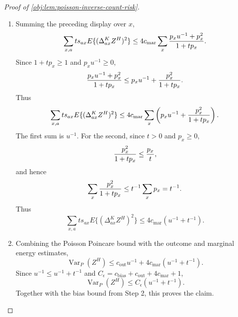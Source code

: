 \begin{proof}[Proof of \cref{obj:lem:poisson-inverse-count-risk}]
\begin{enumerate}
satisfy \(0\le q_{ax}\le p_x\); overlap gives
\(\epsilon\Theta_x\le\theta_{ax}\), while \(s_{ax}\le p_x\) gives
\(\theta_{ax}\le\Theta_x\); and the displayed reciprocal estimates give the required
second- and fourth-moment rate conditions.  Therefore
\cref{obj:lem:poisson-inverse-marginal-energy-scalar} yields
\[
\begin{aligned}
&\theta_{1x}\bigl\{(q_{1x}u^{-1}+q_{1x}^2)(\theta_{0x}+\theta_{0x}^2)\eta_{4,1}
 +(q_{0x}u^{-1}+q_{0x}^2)\eta_{2,0}\bigr\} \\
&\quad+
\theta_{0x}\bigl\{(q_{0x}u^{-1}+q_{0x}^2)(\theta_{1x}+\theta_{1x}^2)\eta_{4,0}
 +(q_{1x}u^{-1}+q_{1x}^2)\eta_{2,1}\bigr\} \\
&\hspace{3cm}\le
(p_xu^{-1}+p_x^2){2c_{\mathrm{mar}}\over1+\Theta_x}.
\end{aligned}
\]
Multiplying the add-one-square bounds by their Poisson rates \(\theta_{ax}=ts_{ax}\), summing over \(a\), and using the preceding display gives the cell estimate
\[
\sum_a ts_{ax}E\{(\Delta^K_{ax}Z^H)^2\}
\le
4c_{\mathrm{mar}}\,
{p_xu^{-1}+p_x^2\over 1+tp_x}.
\]

\item
Summing the preceding display over \(x\),
\[
\sum_{x,a}ts_{ax}E\{(\Delta^K_{ax}Z^H)^2\}
\le
4c_{\mathrm{mar}}
\sum_x{p_xu^{-1}+p_x^2\over 1+tp_x}.
\]
Since \(1+tp_x\ge1\) and \(p_xu^{-1}\ge0\),
\[
{p_xu^{-1}+p_x^2\over 1+tp_x}
\le
p_xu^{-1}+{p_x^2\over 1+tp_x}.
\]
Thus
\[
\sum_{x,a}ts_{ax}E\{(\Delta^K_{ax}Z^H)^2\}
\le
4c_{\mathrm{mar}}
\sum_x\left(p_xu^{-1}+{p_x^2\over 1+tp_x}\right).
\]
The first sum is \(u^{-1}\).  For the second, since \(t>0\) and \(p_x\ge0\),
\[
{p_x^2\over 1+tp_x}\le {p_x\over t},
\]
and hence
\[
\sum_x{p_x^2\over 1+tp_x}\le t^{-1}\sum_xp_x=t^{-1}.
\]
Thus
\[
\sum_{x,a}ts_{ax}E\{(\Delta^K_{ax}Z^H)^2\}
\le
4c_{\mathrm{mar}}(u^{-1}+t^{-1}).
\]

\item
Combining the Poisson Poincare bound with the outcome and marginal energy estimates,
\[
\operatorname{Var}_P(Z^H)
\le
c_{\mathrm{out}}u^{-1}+4c_{\mathrm{mar}}(u^{-1}+t^{-1}).
\]
Since \(u^{-1}\le u^{-1}+t^{-1}\) and
\(C_\epsilon=c_{\mathrm{bias}}+c_{\mathrm{out}}+4c_{\mathrm{mar}}+1\),
\[
\operatorname{Var}_P(Z^H)
\le
C_\epsilon(u^{-1}+t^{-1}).
\]
Together with the bias bound from Step 2, this proves the claim. %
\end{enumerate}
\end{proof}
